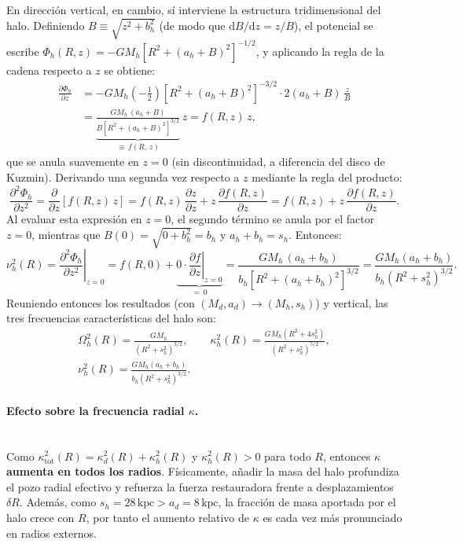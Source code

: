 \documentclass[11pt,letterpaper]{article}
\begin{document}
En dirección vertical, en cambio, sí interviene la estructura tridimensional del halo. Definiendo $B \equiv \sqrt{z^2 + b_h^2}$ (de modo que $\mathrm{d}B/\mathrm{d}z = z/B$), el potencial se escribe $\Phi_h(R, z) = -GM_h\left[R^2 + (a_h + B)^2\right]^{-1/2}$, y aplicando la regla de la cadena respecto a $z$ se obtiene:
\begin{align}
    \frac{\partial \Phi_h}{\partial z}
    &= -G M_h\left(-\frac{1}{2}\right)\left[R^2 + (a_h + B)^2\right]^{-3/2} \cdot 2(a_h + B)\,\frac{z}{B} \nonumber \\
    &= \underbrace{\frac{GM_h\,(a_h + B)}{B\left[R^2 + (a_h + B)^2\right]^{3/2}}}_{\equiv\, f(R,\,z)}\,z
    = f(R, z)\,z,
\end{align}
que se anula suavemente en $z = 0$ (sin discontinuidad, a diferencia del disco de Kuzmin). Derivando una segunda vez respecto a $z$ mediante la regla del producto:
\begin{equation}
    \frac{\partial^2 \Phi_h}{\partial z^2}
    = \frac{\partial}{\partial z}\!\left[f(R, z)\,z\right]
    = f(R, z)\,\frac{\partial z}{\partial z} + z\,\frac{\partial f(R, z)}{\partial z}
    = f(R, z) + z\,\frac{\partial f(R, z)}{\partial z}.
\end{equation}
Al evaluar esta expresión en $z = 0$, el segundo término se anula por el factor $z = 0$, mientras que $B(0) = \sqrt{0 + b_h^2} = b_h$ y $a_h + b_h = s_h$. Entonces:
\begin{equation}
    \nu_h^2(R) = \left.\frac{\partial^2 \Phi_h}{\partial z^2}\right|_{z=0}
    = f(R, 0) + \underbrace{0\cdot\left.\frac{\partial f}{\partial z}\right|_{z=0}}_{=\,0}
    = \frac{GM_h\,(a_h + b_h)}{b_h\left[R^2 + (a_h + b_h)^2\right]^{3/2}}
    = \frac{GM_h(a_h + b_h)}{b_h(R^2 + s_h^2)^{3/2}}.
\end{equation}
Reuniendo entonces los resultados (con $(M_d, a_d) \to (M_h, s_h)$) y vertical, las tres frecuencias características del halo son:
\begin{gather}
    \boxed{\Omega_h^2(R) = \frac{GM_h}{(R^2 + s_h^2)^{3/2}}}, \qquad
    \boxed{\kappa_h^2(R) = \frac{GM_h(R^2 + 4s_h^2)}{(R^2 + s_h^2)^{5/2}}}, \nonumber \\[4pt]
    \boxed{\nu_h^2(R) = \frac{GM_h(a_h + b_h)}{b_h(R^2 + s_h^2)^{3/2}}}.
    \label{eq:halo_freqs}
\end{gather}

\paragraph{Efecto sobre la frecuencia radial $\kappa$.}
\mbox{}\\[0.4em]
Como $\kappa_{\mathrm{tot}}^2(R) = \kappa_d^2(R) + \kappa_h^2(R)$ y $\kappa_h^2(R) > 0$ para todo $R$, entonces \textbf{$\kappa$ aumenta en todos los radios}. Físicamente, añadir la masa del halo profundiza el pozo radial efectivo y refuerza la fuerza restauradora frente a desplazamientos $\delta R$. Además, como $s_h = 28\,\mathrm{kpc} > a_d = 8\,\mathrm{kpc}$, la fracción de masa aportada por el halo crece con $R$, por tanto el aumento relativo de $\kappa$ es cada vez más pronunciado en radios externos.
\end{document}
